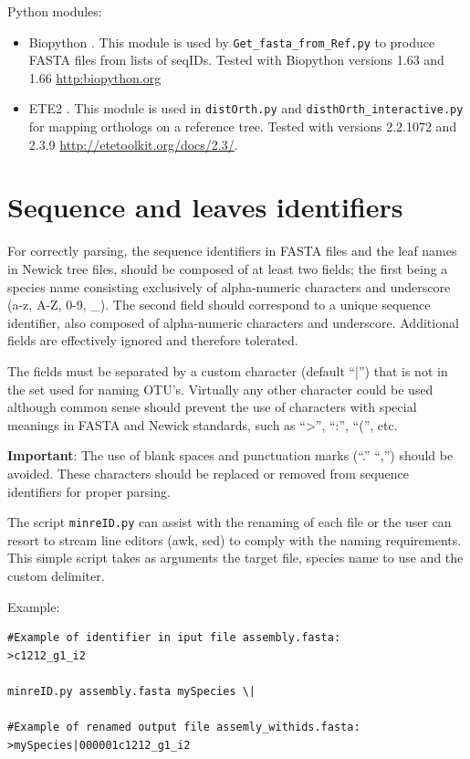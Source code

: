 \documentclass[10pt]{article}
\begin{document}
Python modules:
\begin{itemize}
\item Biopython \citep{Cock2009}. This module is used by \texttt{Get\_fasta\_from\_Ref.py} to produce
FASTA files from lists of seqIDs. Tested with Biopython versions 1.63 and 1.66
\url{http:biopython.org}

\item ETE2 \citep{Huerta-Cepas2010}. This module is used in \texttt{distOrth.py} and
\texttt{disthOrth\_interactive.py} for mapping orthologs on a reference
tree. Tested with versions 2.2.1072 and 2.3.9
\url{http://etetoolkit.org/docs/2.3/}.
\end{itemize}


\section{Sequence and leaves identifiers}\label{sec:sequenceNames} For
correctly parsing, the sequence identifiers in FASTA files and the leaf
names in Newick tree files, should be composed of at least two fields;
the first being a species name consisting exclusively of alpha-numeric
characters and underscore (a-z, A-Z, 0-9, \_). The second field should
correspond to a unique sequence identifier, also composed of
alpha-numeric characters and underscore. Additional fields are
effectively ignored and therefore tolerated.

The fields must be separated by a custom character (default ``|'')
that is not in the set used for naming OTU's. Virtually any other
character could be used although common sense should prevent the use
of characters with special meanings in FASTA and Newick standards,
such as ``>'', ``:'', ``('', etc.

\textbf{Important}: The use of blank spaces and punctuation marks
(``.'' ``,'') should be avoided. These characters should be replaced or
removed from sequence identifiers for proper parsing.

The script \texttt{minreID.py} can assist with the renaming of each
file or the user can resort to stream line editors (awk, sed) to
comply with the naming requirements. This simple script takes as arguments the target file, species name to use and the custom delimiter.


Example:

\begin{verbatim} 
#Example of identifier in iput file assembly.fasta:
>c1212_g1_i2

minreID.py assembly.fasta mySpecies \|

#Example of renamed output file assemly_withids.fasta:
>mySpecies|000001c1212_g1_i2
\end{verbatim}
\end{document}
